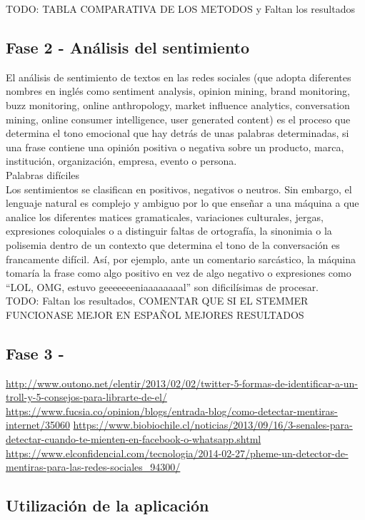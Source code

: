 \documentclass[../all.tex]{subfiles}
\begin{document}
{\color{red} 
    TODO: TABLA COMPARATIVA DE LOS METODOS y Faltan los resultados
}
\newpage
\subsection{Fase 2 - Análisis del sentimiento}
    El análisis de sentimiento de textos en las redes sociales (que adopta diferentes nombres en inglés como sentiment analysis, opinion mining, brand monitoring, buzz monitoring, online anthropology, market influence analytics, conversation mining, online consumer intelligence, user generated content) es el proceso que determina el tono emocional que hay detrás de unas palabras determinadas, si una frase contiene una opinión positiva o negativa sobre un producto, marca, institución, organización, empresa, evento o persona.\\
    
    Palabras difíciles\\
    
    Los sentimientos se clasifican en positivos, negativos o neutros. Sin embargo, el lenguaje natural es complejo y ambiguo por lo que enseñar a una máquina a que analice los diferentes matices gramaticales, variaciones culturales, jergas, expresiones coloquiales o a distinguir faltas de ortografía, la sinonimia o la polisemia dentro de un contexto que determina el tono de la conversación es francamente difícil. Así, por ejemplo, ante un comentario sarcástico, la máquina tomaría la frase como algo positivo en vez de algo negativo o expresiones como “LOL, OMG, estuvo geeeeeeeniaaaaaaaal” son dificilísimas de procesar.\\
    
    
    
	{\color{red} 
		TODO: Faltan los resultados, COMENTAR QUE SI EL STEMMER FUNCIONASE MEJOR EN ESPAÑOL MEJORES RESULTADOS
	}
\newpage
\subsection{Fase 3 -}

\url{http://www.outono.net/elentir/2013/02/02/twitter-5-formas-de-identificar-a-un-troll-y-5-consejos-para-librarte-de-el/}
\url{https://www.fucsia.co/opinion/blogs/entrada-blog/como-detectar-mentiras-internet/35060}
\url{https://www.biobiochile.cl/noticias/2013/09/16/3-senales-para-detectar-cuando-te-mienten-en-facebook-o-whatsapp.shtml}
\url{https://www.elconfidencial.com/tecnologia/2014-02-27/pheme-un-detector-de-mentiras-para-las-redes-sociales_94300/}

\newpage
\subsection{Utilización de la aplicación}
\end{document}
